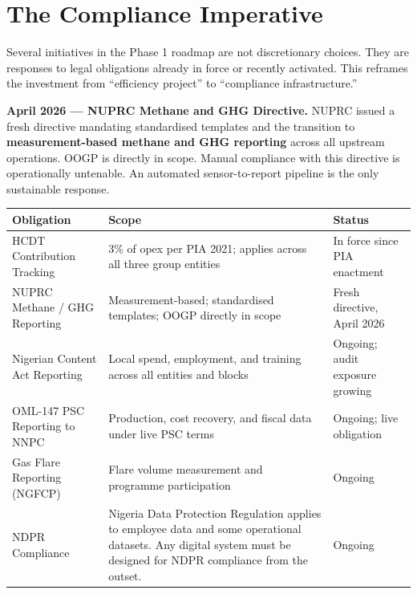 \documentclass[10pt]{article}
\begin{document}
\vspace{10pt}

\section{The Compliance Imperative}

{\small
Several initiatives in the Phase 1 roadmap are not discretionary choices. They are
responses to legal obligations already in force or recently activated. This reframes
the investment from ``efficiency project'' to ``compliance infrastructure.''
}

\vspace{6pt}

\noindent\colorbox{primary!8}{%
\begin{minipage}{\dimexpr\textwidth-2\fboxsep}
  \vspace{5pt}
  \textbf{\color{primary}April 2026 --- NUPRC Methane and GHG Directive.}\quad
  NUPRC issued a fresh directive mandating standardised templates and the transition
  to \textbf{measurement-based methane and GHG reporting} across all upstream
  operations. OOGP is directly in scope. Manual compliance with this directive is
  operationally untenable. An automated sensor-to-report pipeline is the only
  sustainable response.
  \vspace{5pt}
\end{minipage}}

\vspace{6pt}
\small
\begin{tabularx}{\columnwidth}{@{}lXl@{}}
\toprule
\textbf{Obligation} & \textbf{Scope} & \textbf{Status} \\
\midrule
HCDT Contribution Tracking
  & 3\% of opex per PIA 2021; applies across all three group entities
  & In force since PIA enactment \\[3pt]
NUPRC Methane / GHG Reporting
  & Measurement-based; standardised templates; OOGP directly in scope
  & Fresh directive, April 2026 \\[3pt]
Nigerian Content Act Reporting
  & Local spend, employment, and training across all entities and blocks
  & Ongoing; audit exposure growing \\[3pt]
OML-147 PSC Reporting to NNPC
  & Production, cost recovery, and fiscal data under live PSC terms
  & Ongoing; live obligation \\[3pt]
Gas Flare Reporting (NGFCP)
  & Flare volume measurement and programme participation
  & Ongoing \\[3pt]
NDPR Compliance
  & Nigeria Data Protection Regulation applies to employee data and
    some operational datasets. Any digital system must be designed
    for NDPR compliance from the outset.
  & Ongoing \\
\bottomrule
\end{tabularx}
\normalsize
\end{document}
